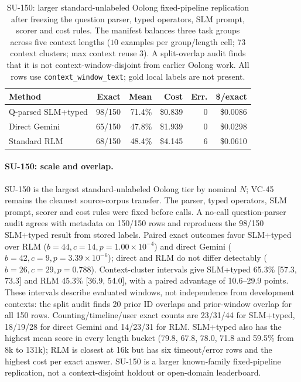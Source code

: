 \begin{table}[!t]
\centering
\small
\setlength{\tabcolsep}{3pt}
\begin{tabular}{@{}lrrrrr@{}}
\toprule
\textbf{Method} & \textbf{Exact} & \textbf{Mean} & \textbf{Cost} & \textbf{Err.} & \textbf{\$/exact} \\
\midrule
Q-parsed SLM+typed & 98/150 & 71.4\% & \$0.839 & 0 & \$0.0086 \\
Direct Gemini & 65/150 & 47.8\% & \$1.939 & 0 & \$0.0298 \\
Standard RLM & 68/150 & 48.4\% & \$4.145 & 6 & \$0.0610 \\
\bottomrule
\end{tabular}
\caption{SU-150: larger standard-unlabeled Oolong fixed-pipeline replication after freezing the question parser, typed operators, SLM prompt, scorer and cost rules. The manifest balances three task groups across five context lengths ($10$ examples per group/length cell; 73 context clusters; max context reuse 3). A split-overlap audit finds that it is not context-window-disjoint from earlier Oolong work. All rows use \texttt{context\_window\_text}; gold local labels are not present.}
\label{tab:supp-oolong-validation-n150}
\end{table}

\paragraph{SU-150: scale and overlap.}
SU-150 is the largest standard-unlabeled Oolong tier by nominal $N$; VC-45 remains the cleanest source-corpus transfer. The parser, typed operators, SLM prompt, scorer and cost rules were fixed before calls. A no-call question-parser audit agrees with metadata on 150/150 rows and reproduces the 98/150 SLM+typed result from stored labels. Paired exact outcomes favor SLM+typed over RLM ($b=44,c=14,p=1.00\times10^{-4}$) and direct Gemini ($b=42,c=9,p=3.39\times10^{-6}$); direct and RLM do not differ detectably ($b=26,c=29,p=0.788$). Context-cluster intervals give SLM+typed 65.3\% [57.3, 73.3] and RLM 45.3\% [36.9, 54.0], with a paired advantage of 10.6--29.9 points. These intervals describe evaluated windows, not independence from development contexts: the split audit finds 20 prior ID overlaps and prior-window overlap for all 150 rows. Counting/timeline/user exact counts are 23/31/44 for SLM+typed, 18/19/28 for direct Gemini and 14/23/31 for RLM. SLM+typed also has the highest mean score in every length bucket (79.8, 67.8, 78.0, 71.8 and 59.5\% from 8k to 131k); RLM is closest at 16k but has six timeout/error rows and the highest cost per exact answer. SU-150 is a larger known-family fixed-pipeline replication, not a context-disjoint holdout or open-domain leaderboard.

